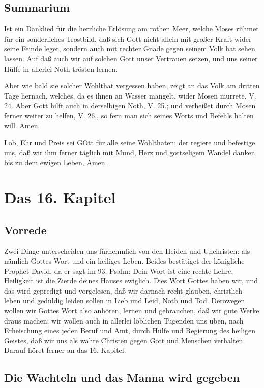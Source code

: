 \section{Summarium}

Ist ein Danklied für die herrliche Erlösung am rothen Meer, welche Moses rühmet für ein sonderliches Trostbild, daß sich Gott nicht allein mit großer Kraft wider seine Feinde leget, sondern auch mit rechter Gnade gegen seinem Volk hat sehen lassen. Auf daß auch wir auf solchen Gott unser Vertrauen setzen, und uns seiner Hülfe in allerlei Noth trösten lernen.

Aber wie bald sie solcher Wohlthat vergessen haben, zeigt an das Volk am dritten Tage hernach, welches, da es ihnen an Wasser mangelt, wider Mosen murrete, V. 24. Aber Gott hilft auch in derselbigen Noth, V. 25.; und verheißet durch Mosen ferner weiter zu helfen, V. 26., so fern man sich seines Worts und Befehls halten will.
Amen.

Lob, Ehr und Preis sei GOtt für alle seine Wohlthaten; der regiere und befestige uns, daß wir ihm ferner täglich mit Mund, Herz und gottseligem Wandel danken bis zu dem ewigen Leben, Amen.

\chapter{Das 16. Kapitel}

\section{Vorrede}

Zwei Dinge unterscheiden uns fürnehmlich von den Heiden und Unchristen: als nämlich Gottes Wort und ein heiliges Leben. Beides bestätiget der königliche Prophet David, da er sagt im 93. Psalm: Dein Wort ist eine rechte Lehre, Heiligkeit ist die Zierde deines Hauses ewiglich. Dies Wort Gottes haben wir, und das wird gepredigt und vorgelesen, daß wir darnach recht gläuben, christlich leben und geduldig leiden sollen in Lieb und Leid, Noth und Tod. Derowegen wollen wir Gottes Wort also anhören, lernen und gebrauchen, daß wir gute Werke draus machen; wir wollen auch in allerlei löblichen Tugenden uns üben, nach Erheischung eines jeden Beruf und Amt, durch Hülfe und Regierung des heiligen Geistes, daß wir uns als wahre Christen gegen Gott und Menschen verhalten. Darauf höret ferner an das 16. Kapitel.

\section{Die Wachteln und das Manna wird gegeben}

